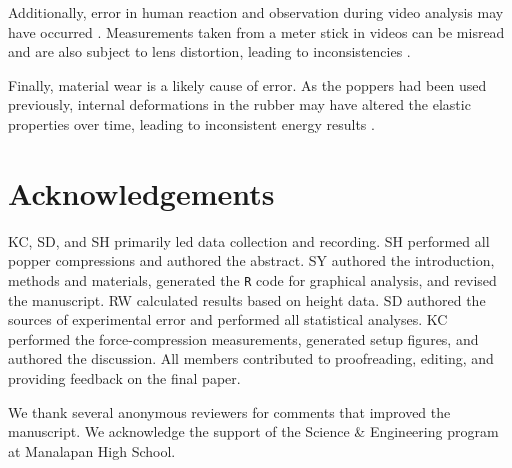 \documentclass[reprint,amsmath,amssymb,aps,twoside]{revtex4-2} %
\begin{document}
Additionally, error in human reaction and observation during video analysis may have occurred \cite{faux:2019:manual}. Measurements taken from a meter stick in videos can be misread and are also subject to lens distortion, leading to inconsistencies \cite{chazot:2025:using,tracker}. 

Finally, material wear is a likely cause of error. As the poppers had been used previously, internal deformations in the rubber may have altered the elastic properties over time, leading to inconsistent energy results \cite{simeonov:2016:coefficient,sendrowicz2022stored}.

    
    
    
    
    
    
    
    
\section{Acknowledgements}
KC, SD, and SH primarily led data collection and recording. SH performed all popper compressions and authored the abstract. SY authored the introduction, methods and materials, generated the \texttt{R} code for graphical analysis, and revised the manuscript. RW calculated results based on height data. SD authored the sources of experimental error and performed all statistical analyses. KC performed the force-compression measurements, generated setup figures, and authored the discussion. All members contributed to proofreading, editing, and providing feedback on the final paper. 

We thank several anonymous reviewers for comments that improved the manuscript. We acknowledge the support of the Science \& Engineering program at Manalapan High School. 









\end{document}
